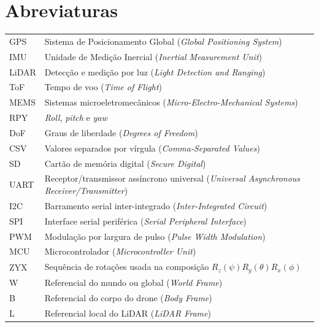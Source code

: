 \chapter*{Abreviaturas}

\begin{tabularx}{\textwidth}{>{\raggedright\arraybackslash}p{2.6cm} >{\raggedright\arraybackslash}X}
GPS   & Sistema de Posicionamento Global (\textit{Global Positioning System})\\
IMU   & Unidade de Medição Inercial (\textit{Inertial Measurement Unit})\\
LiDAR & Detecção e medição por luz (\textit{Light Detection and Ranging})\\
ToF   & Tempo de voo (\textit{Time of Flight})\\
MEMS  & Sistemas microeletromecânicos (\textit{Micro-Electro-Mechanical Systems})\\
RPY   & \textit{Roll}, \textit{pitch} e \textit{yaw}\\
DoF   & Graus de liberdade (\textit{Degrees of Freedom})\\
CSV   & Valores separados por vírgula (\textit{Comma-Separated Values})\\
SD    & Cartão de memória digital (\textit{Secure Digital})\\
UART  & Receptor/transmissor assíncrono universal (\textit{Universal Asynchronous Receiver/Transmitter})\\
I2C   & Barramento serial inter-integrado (\textit{Inter-Integrated Circuit})\\
SPI   & Interface serial periférica (\textit{Serial Peripheral Interface})\\
PWM   & Modulação por largura de pulso (\textit{Pulse Width Modulation})\\
MCU   & Microcontrolador (\textit{Microcontroller Unit})\\
ZYX   & Sequência de rotações usada na composição $R_z(\psi)R_y(\theta)R_x(\phi)$\\
W     & Referencial do mundo ou global (\textit{World Frame})\\
B     & Referencial do corpo do drone (\textit{Body Frame})\\
L     & Referencial local do LiDAR (\textit{LiDAR Frame})\\
\end{tabularx}
